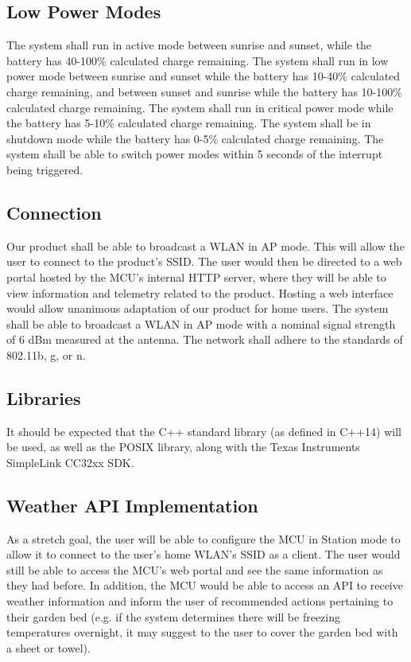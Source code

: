 \documentclass[journal]{IEEEtran}
\begin{document}
\subsection{Low Power Modes} The system shall run in active mode between sunrise and sunset, while the battery has 40-100\% calculated charge remaining. The system shall run in low power mode between sunrise and sunset while the battery has 10-40\% calculated charge remaining, and between sunset and sunrise while the battery has 10-100\% calculated charge remaining. The system shall run in critical power mode while the battery has 5-10\% calculated charge remaining. The system shall be in shutdown mode while the battery has 0-5\% calculated charge remaining. The system shall be able to switch power modes within 5 seconds of the interrupt being triggered.

\subsection{Connection}
Our product shall be able to broadcast a WLAN in AP mode. This will allow the user to connect to the product's SSID. The user would then be directed to a web portal hosted by the MCU's internal HTTP server, where they will be able to view information and telemetry related to the product. Hosting a web interface would allow unanimous adaptation of our product for home users. The system shall be able to broadcast a WLAN in AP mode with a nominal signal strength of 6 dBm measured at the antenna. The network shall adhere to the standards of 802.11b, g, or n.

\subsection{Libraries}
It should be expected that the C++ standard library (as defined in C++14) will be used, as well as the POSIX library, along with the Texas Instruments SimpleLink CC32xx SDK.

\subsection{Weather API Implementation}
As a stretch goal, the user will be able to configure the MCU in Station mode to allow it to connect to the user's home WLAN's SSID as a client. The user would still be able to access the MCU's web portal and see the same information as they had before. In addition, the MCU would be able to access an API to receive weather information and inform the user of recommended actions pertaining to their garden bed (e.g. if the system determines there will be freezing temperatures overnight, it may suggest to the user to cover the garden bed with a sheet or towel).
\end{document}
